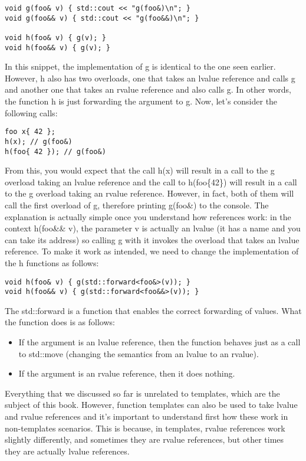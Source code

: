 \begin{lstlisting}[style=styleCXX]
void g(foo& v) { std::cout << "g(foo&)\n"; }
void g(foo&& v) { std::cout << "g(foo&&)\n"; }

void h(foo& v) { g(v); }
void h(foo&& v) { g(v); }
\end{lstlisting}

In this snippet, the implementation of g is identical to the one seen earlier. However, h also has two overloads, one that takes an lvalue reference and calls g and another one that takes an rvalue reference and also calls g. In other words, the function h is just forwarding the argument to g. Now, let’s consider the following calls:

\begin{lstlisting}[style=styleCXX]
foo x{ 42 };
h(x); // g(foo&)
h(foo{ 42 }); // g(foo&)
\end{lstlisting}

From this, you would expect that the call h(x) will result in a call to the g overload taking an lvalue reference and the call to h(foo\{42\}) will result in a call to the g overload taking an rvalue reference. However, in fact, both of them will call the first overload of g, therefore printing g(foo\&) to the console. The explanation is actually simple once you understand how references work: in the context h(foo\&\& v), the parameter v is actually an lvalue (it has a name and you can take its address) so calling g with it invokes the overload that takes an lvalue reference. To make it work as intended, we need to change the implementation of the h functions as follows:

\begin{lstlisting}[style=styleCXX]
void h(foo& v) { g(std::forward<foo&>(v)); }
void h(foo&& v) { g(std::forward<foo&&>(v)); }
\end{lstlisting}

The std::forward is a function that enables the correct forwarding of values. What the function does is as follows:

\begin{itemize}
\item
If the argument is an lvalue reference, then the function behaves just as a call to std::move (changing the semantics from an lvalue to an rvalue).

\item
If the argument is an rvalue reference, then it does nothing.
\end{itemize}

Everything that we discussed so far is unrelated to templates, which are the subject of this book. However, function templates can also be used to take lvalue and rvalue references and it’s important to understand first how these work in non-templates scenarios. This is because, in templates, rvalue references work slightly differently, and sometimes they are rvalue references, but other times they are actually lvalue references.

